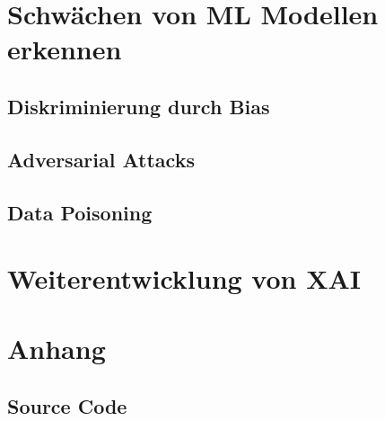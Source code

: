 \documentclass[
  12pt, %
  a4paper, %
  oneside, %
  openany, 
  numbers=noenddot, %
  BCOR=5mm, %
  parskip=half*, %
  thesis, %
]{bfhbook}
\begin{document}
\chapter{Schwächen von ML Modellen erkennen}
\section{Diskriminierung durch Bias}
\section{Adversarial Attacks}
\section{Data Poisoning}

\chapter{Weiterentwicklung von XAI}

\chapter{Anhang}
\section{Source Code}
\label{dt-vis}
\end{document}
